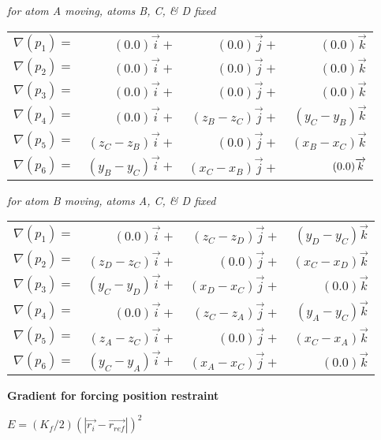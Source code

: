 {\em for atom A moving, atoms B, C, \& D fixed}

\begin{tabular}{lrrr}
$\nabla (p_{1})=$ & $(0.0)\overrightarrow{i}+$ & $(0.0)\overrightarrow{j}+$
& $(0.0)\overrightarrow{k}$ \\ 
$\nabla (p_{2})=$ & $(0.0)\overrightarrow{i}+$ & $(0.0)\overrightarrow{j}+$
& $(0.0)\overrightarrow{k}$ \\ 
$\nabla (p_{3})=$ & $(0.0)\overrightarrow{i}+$ & $(0.0)\overrightarrow{j}+$
& $(0.0)\overrightarrow{k}$ \\ 
$\nabla (p_{4})=$ & $(0.0)\overrightarrow{i}+$ & $(z_{B}-z_{C})%
\overrightarrow{j}+$ & $(y_{C}-y_{B})\overrightarrow{k}$ \\ 
$\nabla (p_{5})=$ & $(z_{C}-z_{B})\overrightarrow{i}+$ & $(0.0)%
\overrightarrow{j}+$ & $(x_{B}-x_{C})\overrightarrow{k}$ \\ 
$\nabla (p_{6})=$ & $(y_{B}-y_{C})\overrightarrow{i}+$ & $(x_{C}-x_{B})%
\overrightarrow{j}+$ & $(0.0)\nolinebreak \bigskip \overrightarrow{k}$%
\end{tabular}
\bigskip 

{\em for atom B moving, atoms A, C, \& D fixed}

\begin{tabular}{lrrr}
$\nabla (p_{1})=$ & $(0.0)\overrightarrow{i}+$ & $(z_{C}-z_{D})%
\overrightarrow{j}+$ & $(y_{D}-y_{C})\overrightarrow{k}$ \\ 
$\nabla (p_{2})=$ & $(z_{D}-z_{C})\overrightarrow{i}+$ & $(0.0)%
\overrightarrow{j}+$ & $(x_{C}-x_{D})\overrightarrow{k}$ \\ 
$\nabla (p_{3})=$ & $(y_{C}-y_{D})\overrightarrow{i}+$ & $(x_{D}-x_{C})%
\overrightarrow{j}+$ & $(0.0)\overrightarrow{k}$ \\ 
$\nabla (p_{4})=$ & $(0.0)\overrightarrow{i}+$ & $(z_{C}-z_{A})%
\overrightarrow{j}+$ & $(y_{A}-y_{C})\overrightarrow{k}$ \\ 
$\nabla (p_{5})=$ & $(z_{A}-z_{C})\overrightarrow{i}+$ & $(0.0)%
\overrightarrow{j}+$ & $(x_{C}-x_{A})\overrightarrow{k}$ \\ 
$\nabla (p_{6})=$ & $(y_{C}-y_{A})\overrightarrow{i}+$ & $(x_{A}-x_{C})%
\overrightarrow{j}+$ & $(0.0)\overrightarrow{k}$%
\end{tabular}
\pagebreak 

{\bf Gradient for forcing position restraint}

$E=(K_{f}/2)\left( \left| \overrightarrow{r_{i}}-\overrightarrow{r_{ref}}%
\right| \right) ^{2}$

